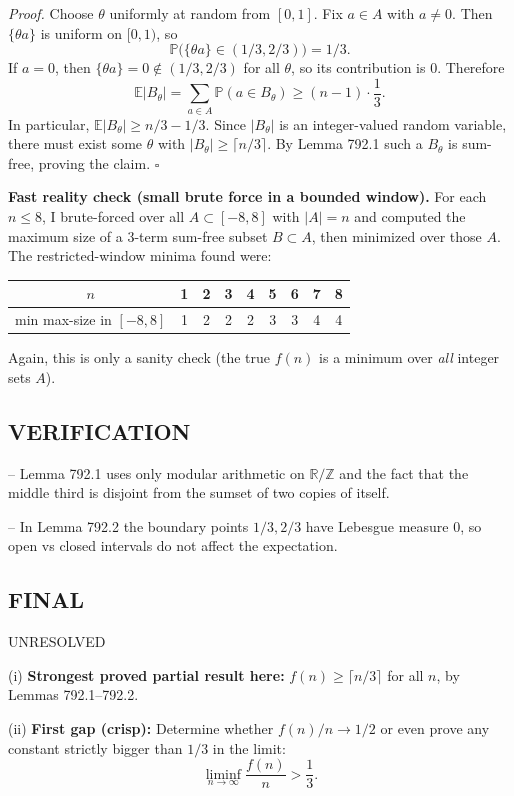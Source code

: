 \emph{Proof.}
Choose $\theta$ uniformly at random from $[0,1]$.
Fix $a\in A$ with $a\ne 0$. Then $\{\theta a\}$ is uniform on $[0,1)$, so
\[\mathbb P\bigl(\{\theta a\}\in (1/3,2/3)\bigr)=1/3.
\]
If $a=0$, then $\{\theta a\}=0\notin(1/3,2/3)$ for all $\theta$, so its contribution is $0$.
Therefore
\[
\mathbb E|B_\theta| = \sum_{a\in A} \mathbb P(a\in B_\theta) \ge (n-1)\cdot\frac13.
\]
In particular, $\mathbb E|B_\theta|\ge n/3 - 1/3$.
Since $|B_\theta|$ is an integer-valued random variable, there must exist some $\theta$ with
$|B_\theta|\ge \lceil n/3\rceil$.
By Lemma 792.1 such a $B_\theta$ is sum-free, proving the claim.
\hfill$\square$

\medskip
\textbf{Fast reality check (small brute force in a bounded window).}
For each $n\le 8$, I brute-forced over all $A\subset[-8,8]$ with $|A|=n$ and computed the maximum size of a 3-term sum-free subset $B\subset A$, then minimized over those $A$.
The restricted-window minima found were:
\begin{center}
\begin{tabular}{c|cccccccc}
$n$ & 1 & 2 & 3 & 4 & 5 & 6 & 7 & 8\\\hline
min max-size in $[-8,8]$ & 1 & 2 & 2 & 2 & 3 & 3 & 4 & 4
\end{tabular}
\end{center}
Again, this is only a sanity check (the true $f(n)$ is a minimum over \emph{all} integer sets $A$).

\subsection*{VERIFICATION}
-- Lemma 792.1 uses only modular arithmetic on $\mathbb R/\mathbb Z$ and the fact that the middle third is disjoint from the sumset of two copies of itself.

-- In Lemma 792.2 the boundary points $1/3,2/3$ have Lebesgue measure $0$, so open vs closed intervals do not affect the expectation.

\subsection*{FINAL}
UNRESOLVED

(i) \textbf{Strongest proved partial result here:} $f(n)\ge \lceil n/3\rceil$ for all $n$, by Lemmas 792.1--792.2.

(ii) \textbf{First gap (crisp):} Determine whether $f(n)/n\to 1/2$ or even prove any constant strictly bigger than $1/3$ in the limit:
\[\liminf_{n\to\infty} \frac{f(n)}{n} > \frac13.
\]

